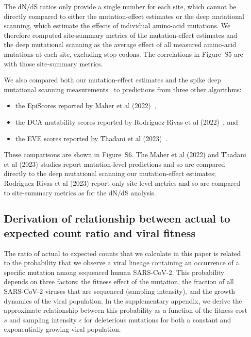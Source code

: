 \documentclass[9pt,twocolumn,twoside]{gsajnl_modified}
\begin{document}
{The dN/dS ratios only provide a single number for each site, which cannot be directly compared to either the mutation-effect estimates or the deep mutational scanning, which estimate the effects of individual amino-acid mutations.
We therefore computed site-summary metrics of the mutation-effect estimates and the deep mutational scanning as the average effect of all measured amino-acid mutations at each site, excluding stop codons.
The correlations in Figure~S5 are with those site-summary metrics.

We also compared both our mutation-effect estimates and the spike deep mutational scanning measurements~\citep{dadonaite2023pseudovirus} to predictions from three other algorithms:
\begin{itemize}
\item the EpiScores reported by Maher et al (2022)~\cite{maher2022predicting},
\item the DCA mutability scores reported by Rodriguez-Rivas et al (2022)~\cite{rodriguez2022epistatic}, and
\item the EVE scores reported by Thadani et al (2023)~\cite{thadani2022learning}.
\end{itemize}
These comparisons are shown in Figure~S6.
The Maher et al (2022) and Thadani et al (2023) studies report mutation-level predictions and so are compared directly to the deep mutational scanning our mutation-effect estimates; Rodriguez-Rivas et al (2023) report only site-level metrics and so are compared to site-summary metrics as for the dN/dS analysis.

\subsection{Derivation of relationship between actual to expected count ratio and viral fitness}
The ratio of actual to expected counts that we calculate in this paper is related to the probability that we observe a viral lineage containing an occurrence of a specific mutation among sequenced human SARS-CoV-2.
This probability depends on three factors: the fitness effect of the mutation, the fraction of all SARS-CoV-2 viruses that are sequenced (sampling intensity), and the growth dynamics of the viral population.
In the supplementary appendix, we derive the approximate relationship between this probability as a function of the fitness cost $s$ and sampling intensity $\epsilon$ for deleterious mutations for both a constant and exponentially growing viral population.

}
\end{document}
